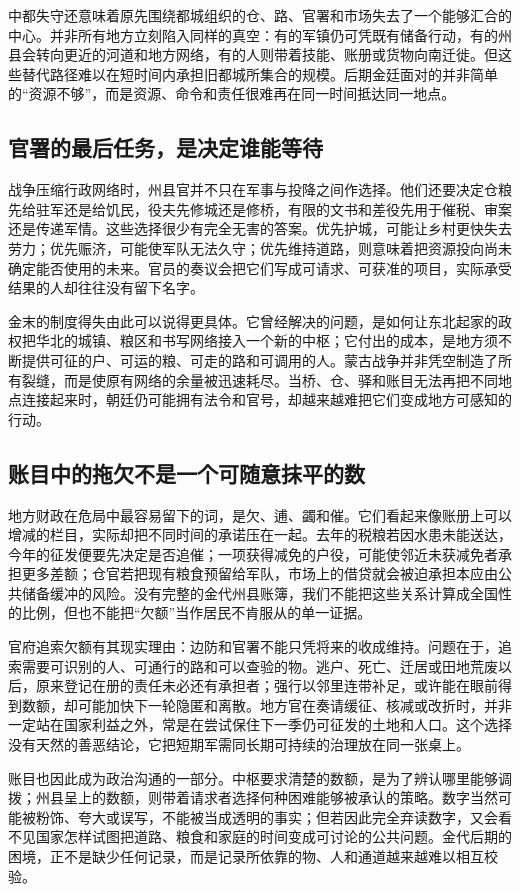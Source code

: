 中都失守还意味着原先围绕都城组织的仓、路、官署和市场失去了一个能够汇合的中心。并非所有地方立刻陷入同样的真空：有的军镇仍可凭既有储备行动，有的州县会转向更近的河道和地方网络，有的人则带着技能、账册或货物向南迁徙。但这些替代路径难以在短时间内承担旧都城所集合的规模。后期金廷面对的并非简单的“资源不够”，而是资源、命令和责任很难再在同一时间抵达同一地点。

\subsection{官署的最后任务，是决定谁能等待}

战争压缩行政网络时，州县官并不只在军事与投降之间作选择。他们还要决定仓粮先给驻军还是给饥民，役夫先修城还是修桥，有限的文书和差役先用于催税、审案还是传递军情。这些选择很少有完全无害的答案。优先护城，可能让乡村更快失去劳力；优先赈济，可能使军队无法久守；优先维持道路，则意味着把资源投向尚未确定能否使用的未来。官员的奏议会把它们写成可请求、可获准的项目，实际承受结果的人却往往没有留下名字。

金末的制度得失由此可以说得更具体。它曾经解决的问题，是如何让东北起家的政权把华北的城镇、粮区和书写网络接入一个新的中枢；它付出的成本，是地方须不断提供可征的户、可运的粮、可走的路和可调用的人。蒙古战争并非凭空制造了所有裂缝，而是使原有网络的余量被迅速耗尽。当桥、仓、驿和账目无法再把不同地点连接起来时，朝廷仍可能拥有法令和官号，却越来越难把它们变成地方可感知的行动。

\subsection{账目中的拖欠不是一个可随意抹平的数}

地方财政在危局中最容易留下的词，是欠、逋、蠲和催。它们看起来像账册上可以增减的栏目，实际却把不同时间的承诺压在一起。去年的税粮若因水患未能送达，今年的征发便要先决定是否追催；一项获得减免的户役，可能使邻近未获减免者承担更多差额；仓官若把现有粮食预留给军队，市场上的借贷就会被迫承担本应由公共储备缓冲的风险。没有完整的金代州县账簿，我们不能把这些关系计算成全国性的比例，但也不能把“欠额”当作居民不肯服从的单一证据。

官府追索欠额有其现实理由：边防和官署不能只凭将来的收成维持。问题在于，追索需要可识别的人、可通行的路和可以查验的物。逃户、死亡、迁居或田地荒废以后，原来登记在册的责任未必还有承担者；强行以邻里连带补足，或许能在眼前得到数额，却可能加快下一轮隐匿和离散。地方官在奏请缓征、核减或改折时，并非一定站在国家利益之外，常是在尝试保住下一季仍可征发的土地和人口。这个选择没有天然的善恶结论，它把短期军需同长期可持续的治理放在同一张桌上。

账目也因此成为政治沟通的一部分。中枢要求清楚的数额，是为了辨认哪里能够调拨；州县呈上的数额，则带着请求者选择何种困难能够被承认的策略。数字当然可能被粉饰、夸大或误写，不能被当成透明的事实；但若因此完全弃读数字，又会看不见国家怎样试图把道路、粮食和家庭的时间变成可讨论的公共问题。金代后期的困境，正不是缺少任何记录，而是记录所依靠的物、人和通道越来越难以相互校验。
